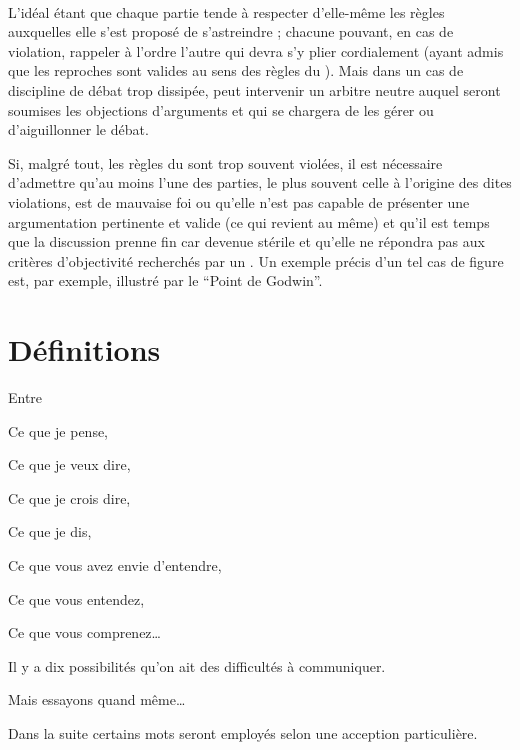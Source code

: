 \paragraph{}
L’idéal étant que chaque partie tende à respecter d’elle-même les règles auxquelles elle s’est proposé de s’astreindre ; chacune pouvant, en cas de violation, rappeler à l’ordre l’autre qui devra s’y plier cordialement (ayant admis que les reproches sont valides au sens des règles du \mainabbr{}). Mais dans un cas de discipline de débat trop dissipée, peut intervenir un arbitre neutre auquel seront soumises les objections d’arguments et qui se chargera de les gérer ou d’aiguillonner le débat.

Si, malgré tout, les règles du \mainabbr{} sont trop souvent violées, il est nécessaire d’admettre qu’au moins l’une des parties, le plus souvent celle à l’origine des dites violations, est de mauvaise foi ou qu’elle n’est pas capable de présenter une argumentation pertinente et valide (ce qui revient au même) et qu’il est temps que la discussion prenne fin car devenue stérile et qu’elle ne répondra pas aux critères d’objectivité recherchés par un \mainabbr{}. Un exemple précis d’un tel cas de figure est, par exemple, illustré par le \enquote{Point de Godwin}.


\section{Définitions}
\epigraph{Entre

Ce que je pense,

Ce que je veux dire,

Ce que je crois dire,

Ce que je dis,

Ce que vous avez envie d’entendre,

Ce que vous entendez,

Ce que vous comprenez…

Il y a dix possibilités qu’on ait des difficultés à communiquer.

Mais essayons quand même…
}{}
Dans la suite certains mots seront employés selon une acception particulière.

